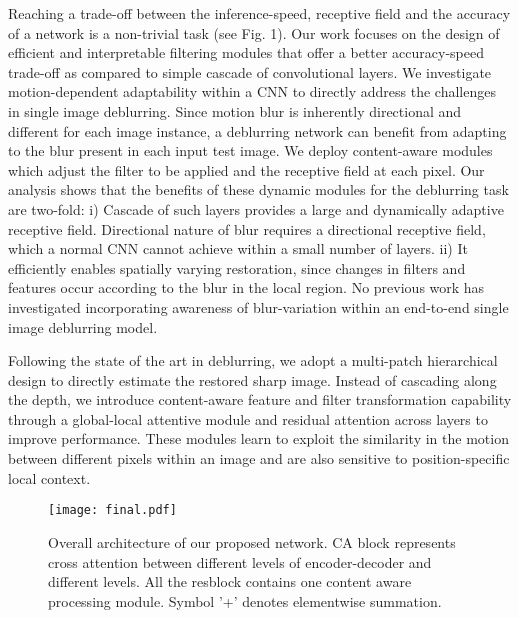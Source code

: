 \documentclass[10pt,twocolumn,letterpaper]{article}
\begin{document}
Reaching a trade-off between the inference-speed, receptive field and the accuracy of a network is a non-trivial task (see Fig. 1). Our work focuses on the design of efficient and interpretable filtering modules that offer a better accuracy-speed trade-off as compared to simple cascade of convolutional layers. We investigate motion-dependent adaptability within a CNN to directly address the challenges in single image deblurring. Since motion blur is inherently directional and different for each image instance, a deblurring network can benefit from adapting to the blur present in each input test image. We deploy content-aware modules which adjust the filter to be applied and the receptive field at each pixel. Our analysis shows that the benefits of these dynamic modules for the deblurring task are two-fold:
i) Cascade of such layers provides a large and dynamically adaptive receptive field. Directional nature of blur requires a directional receptive field, which a normal CNN cannot achieve within a small number of layers.
ii) It efficiently enables spatially varying restoration, since changes in filters and features occur according to the blur in the local region. No previous work has investigated incorporating awareness of blur-variation within an end-to-end single image deblurring model. 




Following the state of the art in deblurring, we adopt a multi-patch hierarchical design to directly estimate the restored sharp image. Instead of cascading along the depth, we introduce content-aware feature and filter transformation capability through a global-local attentive module and residual attention across layers to improve performance. These modules learn to exploit the similarity in the motion between different pixels within an image and are also sensitive to position-specific local context. 

\begin{figure}[t]
\begin{center}
\texttt{[image: final.pdf]}
\end{center}
   \caption{Overall architecture of our proposed network. CA block represents cross attention between different levels of encoder-decoder and different levels. All the resblock contains one content aware processing module. Symbol '+' denotes elementwise summation.}
\label{fig:mainarch}
\end{figure}
\end{document}
